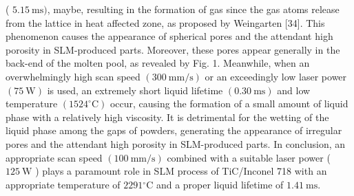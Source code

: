 \documentclass[10pt]{article}
\begin{document}
( $5.15 \mathrm{~ms})$, maybe, resulting in the formation of gas since the gas atoms release from the lattice in heat affected zone, as proposed by Weingarten [34]. This phenomenon causes the appearance of spherical pores and the attendant high porosity in SLM-produced parts. Moreover, these pores appear generally in the back-end of the molten pool, as revealed by Fig. 1. Meanwhile, when an overwhelmingly high scan speed $(300 \mathrm{~mm} / \mathrm{s})$ or an exceedingly low laser power $(75 \mathrm{~W})$ is used, an extremely short liquid lifetime $(0.30 \mathrm{~ms})$ and low temperature $\left(1524^{\circ} \mathrm{C}\right)$ occur, causing the formation of a small amount of liquid phase with a relatively high viscosity. It is detrimental for the wetting of the liquid phase among the gaps of powders, generating the appearance of irregular pores and the attendant high porosity in SLM-produced parts. In conclusion, an appropriate scan speed $(100 \mathrm{~mm} / \mathrm{s})$ combined with a suitable laser power ( $125 \mathrm{~W}$ ) plays a paramount role in SLM process of TiC/Inconel 718 with an appropriate temperature of $2291{ }^{\circ} \mathrm{C}$ and a proper liquid lifetime of $1.41 \mathrm{~ms}$.
\end{document}

